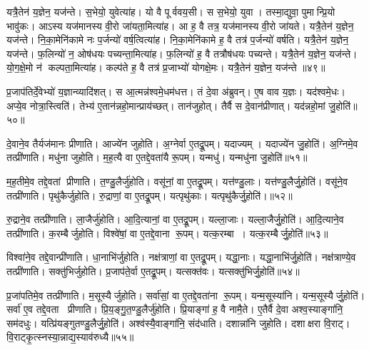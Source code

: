 यत्रै॒तेन॑ य॒ज्ञेन॒ यज॑न्ते। स॒भेयो॒ युवेत्या॑ह। यो वै पूर्ववय॒सी। स स॒भेयो॒ युवा। तस्मा॒द्युवा॒ पुमान्प्रि॒यो भावु॑कः। आऽस्य यज॑मानस्य वी॒रो जा॑यता॒मित्या॑ह। आ ह॒ वै तत्र॒ यज॑मानस्य वी॒रो जा॑यते। यत्रै॒तेन॑ य॒ज्ञेन॒ यज॑न्ते। नि॒का॒मेनि॑कामे नः प॒र्जन्यो॑ वर्\mbox{}ष॒त्वित्या॑ह। नि॒का॒मेनि॑कामे ह॒ वै तत्र॑ प॒र्जन्यो॑ वर्\mbox{}षति। यत्रै॒तेन॑ य॒ज्ञेन॒ यज॑न्ते। फ॒लिन्यो॑ न॒ ओष॑धयः पच्यन्ता॒मित्या॑ह। फ॒लिन्यो॑ ह॒ वै तत्रौष॑धयः पच्यन्ते। यत्रै॒तेन॑ य॒ज्ञेन॒ यज॑न्ते। यो॒ग॒क्षे॒मो न॑ कल्पता॒मित्या॑ह। कल्प॑ते ह॒ वै तत्र॑ प्र॒जाभ्यो॑ योगक्षे॒मः। यत्रै॒तेन॑ य॒ज्ञेन॒ यज॑न्ते ॥४९॥\anuvakamend[अ॒न॒ड्वानित्या॑ह जायते वर्‌षति स॒प्त च॑]

प्र॒जाप॑तिर्दे॒वेभ्यो॑ य॒ज्ञान्व्यादि॑शत्। स आ॒त्मन्न॑श्वमे॒धम॑धत्त। तं दे॒वा अ॑ब्रुवन्। ए॒ष वाव य॒ज्ञः। यद॑श्वमे॒धः। अप्ये॒व नोत्रा॒स्त्विति॑। तेभ्य॑ ए॒तान॑न्नहो॒मान्प्राय॑च्छत्। तान॑जुहोत्। तैर्वै स दे॒वान॑प्रीणात्। यद॑न्नहो॒मां जु॒होति॑॥५०॥

दे॒वाने॒व तैर्यज॑मानः प्रीणाति। आज्ये॑न जुहोति। अ॒ग्नेर्वा ए॒तद्रू॒पम्। यदाज्यम्। यदाज्ये॑न जु॒होति॑। अ॒ग्निमे॒व तत्प्री॑णाति। मधु॑ना जुहोति। म॒ह॒त्यै वा ए॒तद्दे॒वता॑यै रू॒पम्। यन्मधु॑। यन्मधु॑ना जु॒होति॑॥५१॥

म॒ह॒तीमे॒व तद्दे॒वतां प्रीणाति। त॒ण्डु॒लैर्जु॑होति। वसू॑नां॒ वा ए॒तद्रू॒पम्। यत्त॑ण्डु॒लाः। यत्त॑ण्डु॒लैर्जु॒होति॑। वसू॑ने॒व तत्प्री॑णाति। पृथु॑कैर्जुहोति। रु॒द्राणां॒ वा ए॒तद्रू॒पम्। यत्पृथु॑काः। यत्पृथु॑कैर्जु॒होति॑।॥५२॥

रु॒द्राने॒व तत्प्री॑णाति। ला॒जैर्जु॑होति। आ॒दि॒त्यानां॒ वा ए॒तद्रू॒पम्। यल्ला॒जाः। यल्ला॒जैर्जु॒होति॑। आ॒दि॒त्याने॒व तत्प्री॑णाति। क॒रम्बैर्जुहोति। विश्वे॑षां॒ वा ए॒तद्दे॒वाना रू॒पम्। यत्क॒रम्बा। यत्क॒रम्बैर्जु॒होति॑॥५३॥

विश्वा॑ने॒व तद्दे॒वान्प्री॑णाति। धा॒नाभि॑र्जुहोति। नक्ष॑त्राणां॒ वा ए॒तद्रू॒पम्। यद्धा॒नाः। यद्धा॒नाभि॑र्जु॒होति॑। नक्ष॑त्राण्ये॒व तत्प्री॑णाति। सक्तु॑भिर्जुहोति। प्र॒जाप॑ते॒र्वा ए॒तद्रू॒पम्। यत्सक्त॑वः। यत्सक्तु॑भिर्जु॒होति॑॥५४॥

प्र॒जा॑पतिमे॒व तत्प्री॑णाति। म॒सूस्यैर्जुहोति। सर्वा॑सां॒ वा ए॒तद्दे॒वता॑ना रू॒पम्। यन्म॒सूस्या॑नि। यन्म॒सूस्यैर्जु॒होति॑। सर्वा॑ ए॒व तद्दे॒वता प्रीणाति। प्रि॒य॒ङ्गु॒त॒ण्डु॒लैर्जु॑होति। प्रि॒याङ्गा॑ ह॒ वै नामै॒ते। ए॒तैर्वै दे॒वा अश्व॒स्याङ्गा॑नि॒ सम॑दधुः। यत्प्रि॑यङ्गुतण्डु॒लैर्जु॒होति॑। अश्व॑स्यै॒वाङ्गा॑नि॒ संद॑धाति। दशान्ना॑नि जुहोति। दशाक्षरा वि॒राट्। वि॒राट्कृ॒त्स्नस्या॒न्नाद्य॒स्याव॑रुध्यै॥५५॥\anuvakamend[जु॒होति॒ मधु॑ना जु॒होति॒ पृथु॑कैर्जु॒होति॑ क॒रम्बैर्जु॒होति॒ सक्तु॑भिर्जु॒होति॑ प्रियङ्गुतण्डु॒लैर्जु॒होति॑ च॒त्वारि॑ च (अ॒न्नहो॒मानाज्ये॑ना॒ग्नेर्मधु॑ना तण़्डु॒लैः पृथु॑कैर्ला॒जैः क॒रम्बैर्धा॒नाभि॒ सक्तु॑भिर्म॒सूस्यै प्रियङ्गुतण्डु॒लैर्द॒शान्ना॑नि॒ द्वाद॑श। )]

